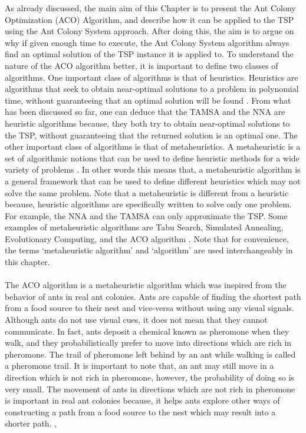 \documentclass[12pt]{article}
\numberwithin{equation}{subsection}
\numberwithin{table}{subsection}
\numberwithin{algorithm}{subsection}
\numberwithin{figure}{subsection}
\begin{document}
As already discussed, the main aim of this Chapter is to present the Ant Colony Optimization (ACO) Algorithm, and describe how it can be applied to the TSP using the Ant Colony System approach. After doing this, the aim is to argue on why if given enough time to execute, the Ant Colony System algorithm always find an optimal solution of the TSP instance it is applied to. To understand the nature of the ACO algorithm better, it is important to define two classes of algorithms. One important class of algorithms is that of heuristics. Heuristics are algorithms that seek to obtain near-optimal solutions to a problem in polynomial time, without guaranteeing that an optimal solution will be found \cite{dorigo_stutzle_thomas_2004}. From what has been discussed so far, one can deduce that the TAMSA and the NNA are heuristic algorithms because, they both try to obtain near-optimal solutions to the TSP, without guaranteeing that the returned solution is an optimal one. The other important class of algorithms is that of metaheuristics.  A metaheuristic is a set of algorithmic notions that can be used to define heuristic methods for a wide variety of problems \cite{dorigo_stutzle_thomas_2004}. In other words this means that, a metaheuristic algorithm is a general framework that can be used to define different heuristics which may not solve the same problem. Note that a metaheuristic is different from a heuristic because, heuristic algorithms are specifically written to solve only one problem. For example, the NNA and the TAMSA can only approximate the TSP. Some examples of metaheuristic algorithms are Tabu Search, Simulated Annealing, Evolutionary Computing, and the ACO algorithm \cite{dorigo_stutzle_thomas_2004}. Note that for convenience, the terms `metaheuristic algorithm' and `algorithm' are used interchangeably in this chapter.\\\\
The ACO algorithm is a metaheuristic algorithm which was inspired from the behavior of ants in real ant colonies. Ants are capable of finding the shortest path from a food source to their nest and vice-versa without using any visual signals. Although ants do not use visual cues, it does not mean that they cannot communicate. In fact, ants deposit a chemical known as pheromone when they walk, and they probabilistically prefer to move into directions which are rich in pheromone. The trail of pheromone left behind by an ant while walking is called a pheromone trail. It is important to note that, an ant may still move in a direction which is not rich in pheromone, however, the probability of doing so is very small. The movement of ants in directions which are not rich in pheromone is important in real ant colonies because, it helps ants explore other ways of constructing a path from a food source to the nest which may result into a shorter path. \cite{dorigo_gambardella_1997}, \cite{dorigo_stutzle_thomas_2004}\\\\ 
\end{document}

